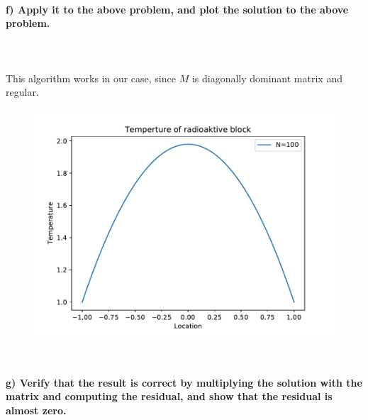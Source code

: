 \paragraph{
    f) Apply it to the above problem, and plot the solution to the
    above problem.
} \ \\
    \\
    This algorithm works in our case, since $M$ is diagonally 
    dominant matrix and regular.
    \begin{figure}[h!]
        \centering
        \includegraphics[width=\textwidth]{../figures/Aufg1f.pdf}
    \end{figure} \ \\ 

\paragraph{
    g) Verify that the result is correct by multiplying the solution
    with the matrix and computing the residual, and show that the
    residual is almost zero.
} \ \\
    \\

